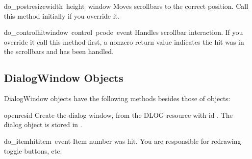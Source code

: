 \begin{funcdesc}{do_postresize}{width\, height\, window}
Moves scrollbars to the correct position. Call this method initially
if you override it.
\end{funcdesc}

\begin{funcdesc}{do_controlhit}{window\, control\, pcode\, event}
Handles scrollbar interaction. If you override it call this method
first, a nonzero return value indicates the hit was in the scrollbars
and has been handled.
\end{funcdesc}

\subsection{DialogWindow Objects}

DialogWindow objects have the following methods besides those of
 objects:

\renewcommand{\indexsubitem}{(DialogWindow method)}

\begin{funcdesc}{open}{resid}
Create the dialog window, from the DLOG resource with id
. The dialog object is stored in .
\end{funcdesc}

\begin{funcdesc}{do_itemhit}{item\, event}
Item number  was hit. You are responsible for redrawing
toggle buttons, etc.
\end{funcdesc}

